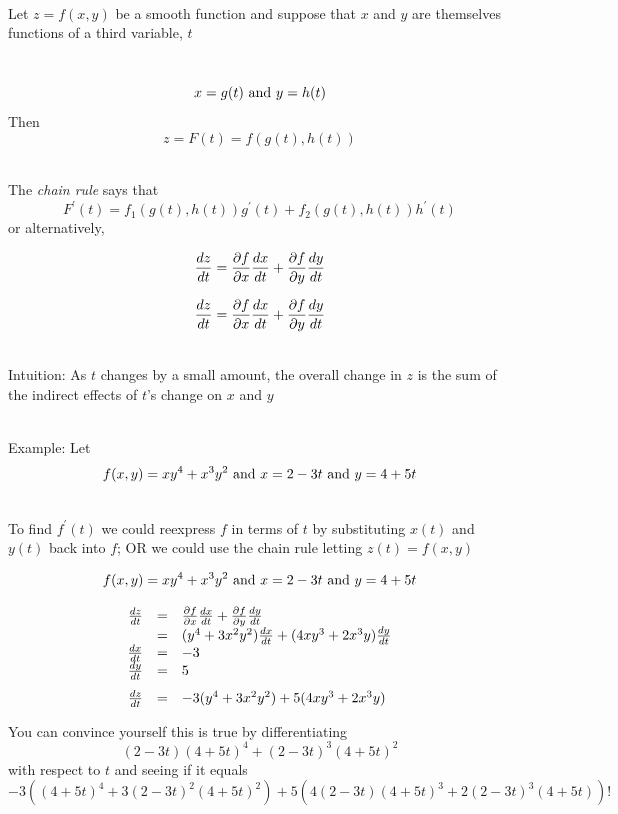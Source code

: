 \documentclass[10pt]{seminar}
\begin{document}
\begin{slide}
\ \\Let $z=f(x, y)$ be a smooth function and suppose that $x$ and $y$ are themselves functions of a third variable, $t$

\ \\$$x=g(t) \hbox{ and }y=h(t)$$ Then $$z=F(t)=f(g(t),h(t))$$

\ \\The \textit{chain rule} says that $$F^\prime(t)=f_1(g(t), h(t))g^\prime(t)+f_2(g(t), h(t))h^\prime(t)$$ or alternatively, 

$${{dz}\over {dt}}={{\partial f}\over {\partial x}}{{dx}\over {dt}}+{{\partial f}\over {\partial y}}{{dy}\over {dt}}$$


\newslide
$${{dz}\over {dt}}={{\partial f}\over {\partial x}}{{dx}\over {dt}}+{{\partial f}\over {\partial y}}{{dy}\over {dt}}$$

\ \\Intuition: As $t$ changes by a small amount, the overall change in $z$ is the sum of the indirect effects of $t$'s change on $x$ and $y$

\ \\Example: Let $$f(x, y)=xy^4+x^3y^2 \hbox{ and }x=2-3t\hbox{ and }y=4+5t$$

\ \\To find $f^\prime(t)$ we could reexpress $f$ in terms of $t$ by substituting $x(t)$ and $y(t)$ back into $f$; OR we could use the chain rule letting $z(t)=f(x, y)$

\newslide

$$f(x, y)=xy^4+x^3y^2 \hbox{ and }x=2-3t\hbox{ and }y=4+5t$$

$$
\begin{array}{rcl}
{{dz}\over{dt}} &=& {{\partial f}\over {\partial x}}{{dx}\over {dt}}+{{\partial f}\over {\partial y}}{{dy}\over {dt}}\\
&=& (y^4 +3x^2y^2){{dx}\over {dt}}+(4xy^3+2x^3y){{dy}\over {dt}}\\
{{dx}\over {dt}}&=&-3 \\
{{dy}\over {dt}}&=& 5  \vspace{.1in} \\

{{dz}\over{dt}}  &=& -3(y^4 +3x^2y^2)+5(4xy^3+2x^3y)
\end{array}
$$



You can convince yourself this is true by differentiating $$(2-3t)(4+5t)^4+(2-3t)^3(4+5t)^2 $$ with respect to $t$ and seeing if it equals $$-3((4+5t)^4 +3(2-3t)^2(4+5t)^2)+5(4(2-3t)(4+5t)^3+2(2-3t)^3(4+5t))!$$


\end{slide}
\end{document}
